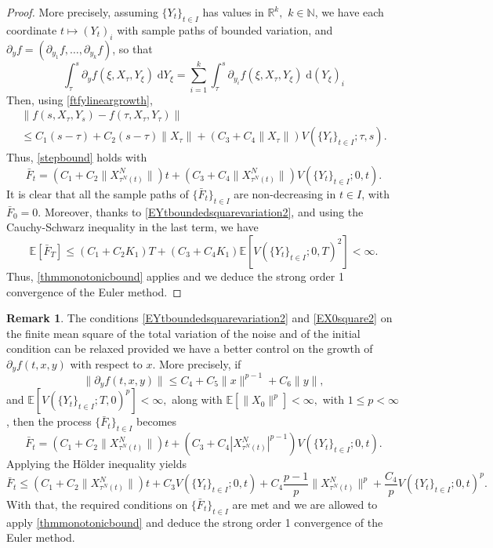 \documentclass[reqno,12pt]{amsart}
\theoremstyle{plain} %
\theoremstyle{definition} %
\newtheorem{remark}{Remark}[section]
\begin{document}
\begin{proof}
    More precisely, assuming $\{Y_t\}_{t\in I}$ has values in $\mathbb{R}^k,$ $k\in \mathbb{N}$, we have each coordinate $t \mapsto (Y_t)_i$ with sample paths of bounded variation, and $\partial_y f = (\partial_{y_1}f, \ldots, \partial_{y_k}f)$, so that
    \[
        \int_\tau^s \partial_y f(\xi, X_\tau, Y_\xi) \;\mathrm{d} Y_\xi = \sum_{i=1}^k \int_\tau^s \partial_{y_i} f(\xi, X_\tau, Y_\xi) \;\mathrm{d} (Y_\xi)_i
    \]
    Then, using \eqref{ftfylineargrowth},
    \begin{multline*}
        \|f(s, X_\tau, Y_s) - f(\tau, X_\tau, Y_\tau)\| \\
        \leq C_1 (s-\tau) + C_2(s-\tau) \|X_\tau\| + (C_3 + C_4 \|X_\tau\|) V(\{Y_t\}_{t\in I}; \tau, s).
    \end{multline*}
    Thus, \eqref{stepbound} holds with
    \[
        \bar F_t = (C_1 + C_2 \|X_{\tau^N(t)}^N\|)t + (C_3 + C_4 \|X_{\tau^N(t)}^N\|) V(\{Y_t\}_{t\in I}; 0, t).
    \]
    It is clear that all the sample paths of $\{\bar F_t\}_{t\in I}$ are non-decreasing in $t\in I$, with $\bar F_0 = 0$. Moreover, thanks to \eqref{EYtboundedsquarevariation2}, and using the Cauchy-Schwarz inequality in the last term, we have
    \[
        \mathbb{E}[\bar F_T] \leq (C_1 + C_2 K_1)T + (C_3 + C_4K_1)\mathbb{E}[V(\{Y_t\}_{t\in I}; 0, T)^2] < \infty.
    \]
    Thus, \cref{thmmonotonicbound} applies and we deduce the strong order 1 convergence of the Euler method.
\end{proof}

\begin{remark}
    The conditions \eqref{EYtboundedsquarevariation2} and \eqref{EX0square2} on the finite mean square of the total variation of the noise and of the initial condition can be relaxed provided we have a better control on the growth of $\partial_y f(t, x, y)$ with respect to $x$. More precisely, if
    \[
        \|\partial_y f(t, x, y)\| \leq C_4 + C_5\|x\|^{p-1} + C_6\|y\|,
    \]
    and $\mathbb{E}[V(\{Y_t\}_{t\in I}; T, 0)^p] < \infty,$ along with $\mathbb{E}[\|X_0\|^p] < \infty,$ with $1 \leq p < \infty$, then the process $\{\bar F_t\}_{t\in I}$ becomes
    \[
        \bar F_t = (C_1 + C_2 \|X_{\tau^N(t)}^N\|)t + (C_3 + C_4 |X_{\tau^N(t)}^N|^{p-1}) V(\{Y_t\}_{t\in I}; 0, t).
    \]
    Applying the H\"older inequality yields
    \[
        \bar F_t \leq (C_1 + C_2 \|X_{\tau^N(t)}^N\|)t + C_3 V(\{Y_t\}_{t\in I}; 0, t) + C_4 \frac{p-1}{p}\|X_{\tau^N(t)}^N\|^p  + \frac{C_4}{p} V(\{Y_t\}_{t\in I}; 0, t)^p.
    \]
    With that, the required conditions on $\{\bar F_t\}_{t\in I}$ are met and we are allowed to apply \cref{thmmonotonicbound} and deduce the strong order 1 convergence of the Euler method.
\end{remark}
\end{document}
